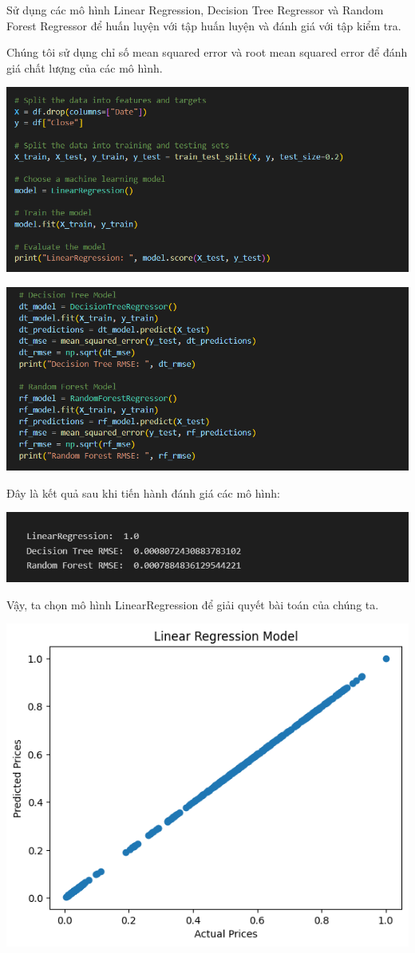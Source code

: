\documentclass[12pt,a4paper]{article}
\begin{document}
\begin{enumerate}
		Sử dụng các mô hình Linear Regression, Decision Tree Regressor và Random Forest Regressor để huấn luyện với tập huấn luyện và đánh giá với tập kiểm tra. 
		
		Chúng tôi sử dụng chỉ số mean squared error và root mean squared error để đánh giá chất lượng của các mô hình.
		
		\includegraphics{5}
		
		\includegraphics{6}
		
		Đây là kết quả sau khi tiến hành đánh giá các mô hình:
		
		\includegraphics{7}
		
		Vậy, ta chọn mô hình LinearRegression để giải quyết bài toán của chúng ta.
		
		\includegraphics{output2}
		

\end{enumerate}
\end{document}
